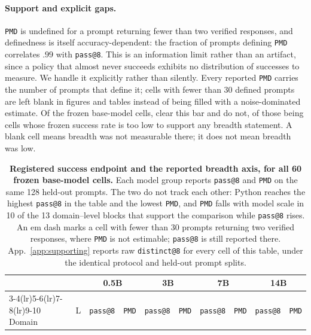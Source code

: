 \documentclass{article}
\makeatletter
\newcommand{\1}{\mathbf 1}
\newcommand{\pmd}{\texttt{PMD}}
\newcommand{\distk}{\texttt{distinct@8}}
\theoremstyle{remark}
\theoremstyle{definition}
\theoremstyle{plain}
\makeatother
\begin{document}
\paragraph{Support and explicit gaps.}
\pmd{} is undefined for a prompt returning fewer than two verified responses,
and definedness is itself accuracy-dependent: the fraction of prompts defining
\pmd{} correlates $.99$ with \texttt{pass@8}. This is an information limit
rather than an artifact, since a policy that almost never succeeds exhibits no
distribution of successes to measure. We handle it explicitly rather than
silently. Every reported \pmd{} carries the number of prompts that define it;
cells with fewer than 30 defined prompts are left blank in figures and tables
instead of being filled with a noise-dominated estimate. Of the \MDcells{} frozen
base-model cells, \MDreportable{} clear this bar and \MDgaps{} do not,
\MDtopgapcount{} of those being \MDtopgapdomain{} cells whose frozen success
rate is too low to support any breadth statement.
A blank cell means breadth was not measurable there; it does not mean breadth
was low.

\begin{table}[!htbp]
  \centering
  \caption{\textbf{Registered success endpoint and the reported breadth axis,
  for all 60 frozen base-model cells.} Each model group reports
  \texttt{pass@8} and \pmd{} on the same 128 held-out prompts. The two do not
  track each other: Python reaches the highest \texttt{pass@8} in the table and
  the lowest \pmd{}, and \pmd{} falls with model scale in 10 of the 13
  domain--level blocks that support the comparison while \texttt{pass@8} rises.
  An em dash marks a cell with fewer than 30 prompts returning two verified
  responses, where \pmd{} is not estimable; \texttt{pass@8} is still reported
  there. App.~\ref{app:supporting} reports raw \distk{} for every cell of this
  table, under the identical protocol and held-out prompt splits.}
  \label{tab:registered-endpoints-appendix}
  \small
  \begin{tabular}{llcccccccc}
    \toprule
    & & \multicolumn{2}{c}{0.5B} & \multicolumn{2}{c}{3B}
      & \multicolumn{2}{c}{7B} & \multicolumn{2}{c}{14B} \\
    \cmidrule(lr){3-4}\cmidrule(lr){5-6}\cmidrule(lr){7-8}\cmidrule(lr){9-10}
    Domain & L & \texttt{pass@8} & \pmd{} & \texttt{pass@8} & \pmd{}
           & \texttt{pass@8} & \pmd{} & \texttt{pass@8} & \pmd{} \\
    \midrule
    
  \end{tabular}
\end{table}
\end{document}
